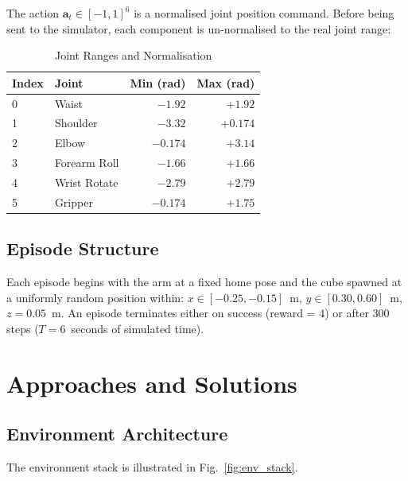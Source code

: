\documentclass[conference]{IEEEtran}
\begin{document}
The action $\mathbf{a}_t \in [-1,1]^6$ is a normalised joint
position command.
Before being sent to the simulator, each component is
un-normalised to the real joint range:

\begin{table}[h]
    \centering
    \caption{Joint Ranges and Normalisation}
    \label{tab:joints}
    \begin{tabular}{llrr}
        \toprule
        Index & Joint & Min (rad) & Max (rad) \\
        \midrule
        0 & Waist          & $-1.92$ & $+1.92$ \\
        1 & Shoulder       & $-3.32$ & $+0.174$ \\
        2 & Elbow          & $-0.174$ & $+3.14$ \\
        3 & Forearm Roll   & $-1.66$ & $+1.66$ \\
        4 & Wrist Rotate   & $-2.79$ & $+2.79$ \\
        5 & Gripper        & $-0.174$ & $+1.75$ \\
        \bottomrule
    \end{tabular}
\end{table}

\subsection{Episode Structure}

Each episode begins with the arm at a fixed home pose and the cube
spawned at a uniformly random position within:
$x \in [-0.25, -0.15]$~m, $y \in [0.30, 0.60]$~m, $z = 0.05$~m.
An episode terminates either on success (reward = 4) or after
300 steps ($T = 6$~seconds of simulated time).


\section{Approaches and Solutions}
\label{sec:approach}

\subsection{Environment Architecture}

The environment stack is illustrated in Fig.~\ref{fig:env_stack}.

\end{document}
